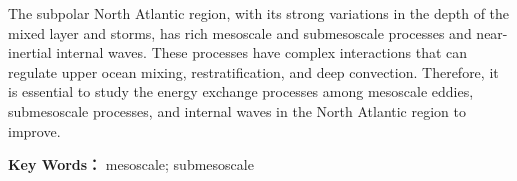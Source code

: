 \begin{enabstract}
The subpolar North Atlantic region, with its strong variations in the depth of the mixed layer and storms, has rich mesoscale and submesoscale processes and near-inertial internal waves. These processes have complex interactions that can regulate upper ocean mixing, restratification, and deep convection. Therefore, it is essential to study the energy exchange processes among mesoscale eddies, submesoscale processes, and internal waves in the North Atlantic region to improve.

\noindent\textbf{Key Words：} mesoscale; submesoscale

\end{enabstract}
